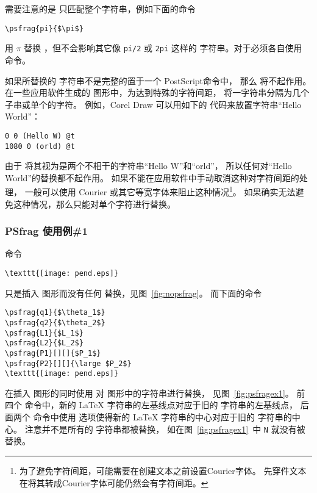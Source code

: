 需要注意的是  只匹配整个字符串，例如下面的命令
\begin{lstlisting}
\psfrag{pi}{$\pi$}
\end{lstlisting}
用 $\pi$ 替换 ，但不会影响其它像 \texttt{pi/2} 或 \texttt{2pi} 这样的  字符串。对于必须各自使用  命令。

如果所替换的  字符串不是完整的置于一个 PostScript命令中，
那么  将不起作用。
在一些应用软件生成的  图形中，为达到特殊的字符间距，
将一字符串分隔为几个子串或单个的字符。
例如，Corel Draw 可以用如下的  代码来放置字符串“Hello World”：
\begin{Verbatim}[xleftmargin=1cm]
0 0 (Hello W) @t
1080 0 (orld) @t
\end{Verbatim}
由于  将其视为是两个不相干的字符串“Hello W”和“orld”，
所以任何对“Hello World”的替换都不起作用。
如果不能在应用软件中手动取消这种对字符间距的处理，
一般可以使用 Courier 或其它等宽字体来阻止这种情况\footnote{%
	为了避免字符间距，可能需要在创建文本之前设置Courier字体。
	先穿件文本在将其转成Courier字体可能仍然会有字符间距。}。
如果确实无法避免这种情况，那么只能对单个字符进行替换。

\subsubsection{PSfrag 使用例\#1}\label{sssec:psfragex1}

命令
\begin{lstlisting}
\texttt{[image: pend.eps]}
\end{lstlisting}
只是插入  图形而没有任何  替换，见图~\ref{fig:nopsfrag}。
而下面的命令
\begin{lstlisting}
\psfrag{q1}{$\theta_1$}
\psfrag{q2}{$\theta_2$}
\psfrag{L1}{$L_1$}
\psfrag{L2}{$L_2$}
\psfrag{P1}[][]{$P_1$}
\psfrag{P2}[][]{\large $P_2$}
\texttt{[image: pend.eps]}
\end{lstlisting}
在插入  图形的同时使用  对  图形中的字符串进行替换，
见图~\ref{fig:psfragex1}。
前四个  命令中，新的 \LaTeX{} 字符串的左基线点对应于旧的  字符串的左基线点，
后面两个  命令中使用 \opt{[][]} 选项使得新的 \LaTeX{} 字符串的中心对应于旧的  字符串的中心。
注意并不是所有的  字符串都被替换，
如在图~\ref{fig:psfragex1}~中 \texttt{N} 就没有被替换。

